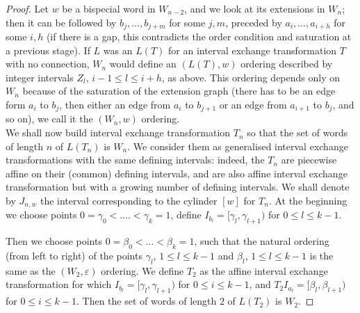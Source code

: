 \documentclass[12pt,a4paper]{amsart}
\begin{document}
\begin{proof}
 
 Let $w$ be a bispecial word in $W_{n-2}$, and we look at its extensions  in $W_n$; then  it can be followed by $b_j,\ldots ,b_{j+m}$ for some $j,m$, preceded by $a_i, \ldots ,a_{i+h}$ for some $i,h$ (if there is a gap, this contradicts the order condition and saturation at a  previous stage). If $L$ was an $L(T)$ for an interval exchange transformation $T$ with no connection, $W_n$ would define an $(L(T),w)$ ordering described by  integer intervals $Z_l$, $i-1\leq l\leq i+h$, as above.
 This ordering depends only on $W_n$ because of the saturation of the extension graph (there has to be an edge form $a_i$ to $b_j$, then either an edge from $a_i$ to $b_{j+1}$ or an edge from $a_{i+1}$ to
$b_j$, 
and so  on), we call it the $(W_n,w)$ ordering.  \\


 We shall now build interval exchange transformation $T_n$ so that the set of words of  length $n$ of  $L(T_n)$ is $W_n$. We consider them  as generalised interval exchange transformations with the same defining intervals: indeed, the $T_n$  are piecewise affine on their (common) defining intervals, and are also affine interval exchange transformation but with a growing number  of defining intervals.  We shall denote by $J_{n,w}$ the interval corresponding to the cylinder $[w]$ for $T_n$. At the beginning we choose
points $0=\gamma_{0}<.\ldots < \gamma_{k}=1$, define  $I_{b_l}=[\gamma_l,\gamma_{l+1})$ for $0\leq  l \leq k-1$.

Then we  choose  points $0=\beta_0<\ldots < \beta_{k}=1$, such that the natural ordering (from left to right) of the points  $\gamma_l$, $1\leq l\leq k-1$
and $\beta_l$, $1\leq l\leq k-1$ is the  same as the $(W_2, \varepsilon)$ ordering. We  define $T_2$ as the affine  interval exchange transformation for which  $I_{b_l}=[\gamma_l,\gamma_{l+1})$ for $0\leq i\leq k-1$, and $T_2I_{a_l}=[\beta_l,\beta_{l+1})$ for $0\leq i\leq k-1$. Then the set of words of length $2$ of $L(T_2)$ is $W_2$. 


\end{proof}
\end{document}
